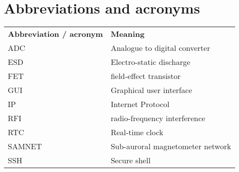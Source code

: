\chapter{Abbreviations and acronyms}
\begin{table}[!h]
  \begin{center}
    \begin{tabular}{ll}
      \textbf{Abbreviation / acronym} & \textbf{Meaning} \\
      ADC & Analogue to digital converter \\
      ESD & Electro-static discharge\\
      FET & field-effect transistor\\
      GUI & Graphical user interface\\
      IP & Internet Protocol\\
      RFI & radio-frequency interference\\
      RTC & Real-time clock\\
      SAMNET & Sub-auroral magnetometer network\\
      SSH & Secure shell\\
    \end{tabular}
    \label{tab:-abbreviations}
  \end{center}
\end{table}
